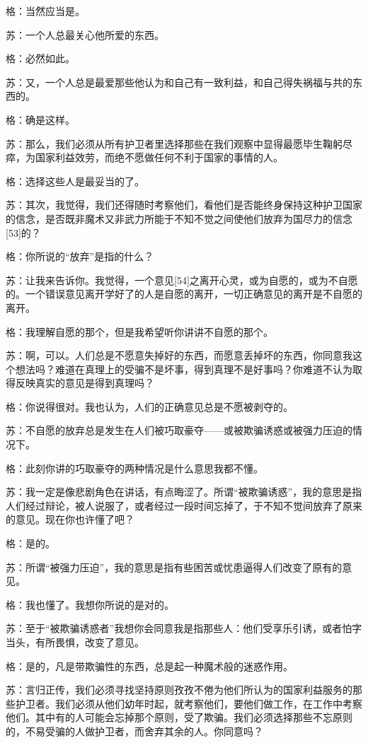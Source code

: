 \documentclass[12pt,oneside]{book}
\begin{document}
格：当然应当是。

苏：一个人总最关心他所爱的东西。

格：必然如此。

苏：又，一个人总是最爱那些他认为和自己有一致利益，和自己得失祸福与共的东西的。

格：确是这样。

苏：那么，我们必须从所有护卫者里选择那些在我们观察中显得最愿毕生鞠躬尽瘁，为国家利益效劳，而绝不愿做任何不利于国家的事情的人。

格：选择这些人是最妥当的了。

苏：其次，我觉得，我们还得随时考察他们，看他们是否能终身保持这种护卫国家的信念，是否既非魔术又非武力所能于不知不觉之间使他们放弃为国尽力的信念[53]的？

格：你所说的“放弃”是指的什么？

苏：让我来告诉你。我觉得，一个意见[54]之离开心灵，或为自愿的，或为不自愿的。一个错误意见离开学好了的人是自愿的离开，一切正确意见的离开是不自愿的离开。

格：我理解自愿的那个，但是我希望听你讲讲不自愿的那个。

苏：啊，可以。人们总是不愿意失掉好的东西，而愿意丢掉坏的东西，你同意我这个想法吗？难道在真理上的受骗不是坏事，得到真理不是好事吗？你难道不认为取得反映真实的意见是得到真理吗？

格：你说得很对。我也认为，人们的正确意见总是不愿被剥夺的。

苏：不自愿的放弃总是发生在人们被巧取豪夺——或被欺骗诱惑或被强力压迫的情况下。

格：此刻你讲的巧取豪夺的两种情况是什么意思我都不懂。

苏：我一定是像悲剧角色在讲话，有点晦涩了。所谓“被欺骗诱惑”，我的意思是指人们经过辩论，被人说服了，或者经过一段时间忘掉了，于不知不觉间放弃了原来的意见。现在你也许懂了吧？

格：是的。

苏：所谓“被强力压迫”，我的意思是指有些困苦或忧患逼得人们改变了原有的意见。

格：我也懂了。我想你所说的是对的。

苏：至于“被欺骗诱惑者”我想你会同意我是指那些人：他们受享乐引诱，或者怕字当头，有所畏惧，改变了意见。

格：是的，凡是带欺骗性的东西，总是起一种魔术般的迷惑作用。

苏：言归正传，我们必须寻找坚持原则孜孜不倦为他们所认为的国家利益服务的那些护卫者。我们必须从他们幼年时起，就考察他们，要他们做工作，在工作中考察他们。其中有的人可能会忘掉那个原则，受了欺骗。我们必须选择那些不忘原则的，不易受骗的人做护卫者，而舍弃其余的人。你同意吗？
\end{document}

